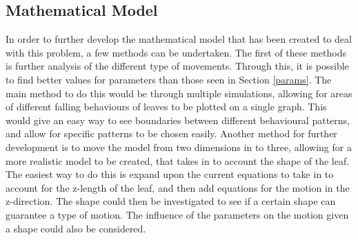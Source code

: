 \subsection{Mathematical Model}

In order to further develop the mathematical model that has been created to deal with this problem, a few methods can be undertaken. The first of these methods is further analysis of the different type of movements. Through this, it is possible to find better values for parameters than those seen in Section \ref{params}. The main method to do this would be through multiple simulations, allowing for areas of different falling behaviours of leaves to be plotted on a single graph. This would give an easy way to see boundaries between different behavioural patterns, and allow for specific patterns to be chosen easily.
\newline \newline Another method for further development is to move the model from two dimensions in to three, allowing for a more realistic model to be created, that takes in to account the shape of the leaf. The easiest way to do this is expand upon the current equations to take in to account for the z-length of the leaf, and then add equations for the motion in the z-direction. The shape could then be investigated to see if a certain shape can guarantee a type of motion. The influence of the parameters on the motion given a shape could also be considered.  


